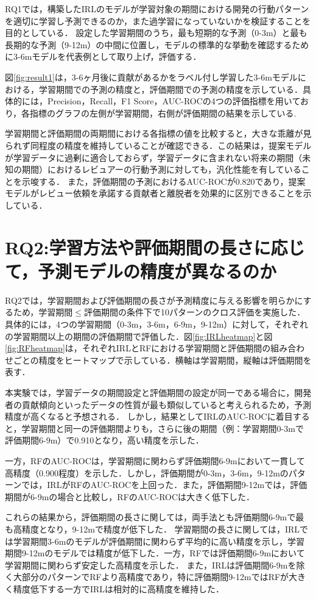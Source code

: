 \documentclass[11pt]{jreport}
\begin{document}
RQ1では，構築したIRLのモデルが学習対象の期間における開発の行動パターンを適切に学習し予測できるのか，また過学習になっていないかを検証することを目的としている．
設定した学習期間のうち，最も短期的な予測（0-3m）と最も長期的な予測（9-12m）の中間に位置し，モデルの標準的な挙動を確認するために3-6mモデルを代表例として取り上げ，評価する．

図\ref{fig:result1}は，3-6ヶ月後に貢献があるかをラベル付し学習した3-6mモデルにおける，学習期間での予測の精度と，評価期間での予測の精度を示している．具体的には，Precision，Recall，F1 Score，AUC-ROCの4つの評価指標を用いており，各指標のグラフの左側が学習期間，右側が評価期間の結果を示している.

学習期間と評価期間の両期間における各指標の値を比較すると，大きな乖離が見られず同程度の精度を維持していることが確認できる．この結果は，提案モデルが学習データに過剰に適合しておらず，学習データに含まれない将来の期間（未知の期間）におけるレビュアーの行動予測に対しても，汎化性能を有していることを示唆する．
また，評価期間の予測におけるAUC-ROCが0.820であり，提案モデルがレビュー依頼を承諾する貢献者と離脱者を効果的に区別できることを示している．

\section{RQ2:学習方法や評価期間の長さに応じて，予測モデルの精度が異なるのか}
RQ2では，学習期間および評価期間の長さが予測精度に与える影響を明らかにするため，学習期間$\leq$評価期間の条件下で10パターンのクロス評価を実施した．具体的には，4つの学習期間（0-3m，3-6m，6-9m，9-12m）に対して，それぞれの学習期間以上の期間の評価期間で評価した．図\ref{fig:IRLheatmap}と図\ref{fig:RFheatmap}は，それぞれIRLとRFにおける学習期間と評価期間の組み合わせごとの精度をヒートマップで示している．横軸は学習期間，縦軸は評価期間を表す．

本実験では，学習データの期間設定と評価期間の設定が同一である場合に，開発者の貢献傾向といったデータの性質が最も類似していると考えられるため，予測精度が高くなると予想される．
しかし，結果としてIRLのAUC-ROCに着目すると，学習期間と同一の評価期間よりも，さらに後の期間（例：学習期間0-3mで評価期間6-9m）で0.910となり，高い精度を示した．


一方，RFのAUC-ROCは，学習期間に関わらず評価期間6-9mにおいて一貫して高精度（0.900程度）を示した．しかし，評価期間が0-3m，3-6m，9-12mのパターンでは，IRLがRFのAUC-ROCを上回った．また，評価期間9-12mでは，評価期間が6-9mの場合と比較し，RFのAUC-ROCは大きく低下した．

これらの結果から，評価期間の長さに関しては，両手法とも評価期間6-9mで最も高精度となり，9-12mで精度が低下した．
学習期間の長さに関しては，IRLでは学習期間3-6mのモデルが評価期間に関わらず平均的に高い精度を示し，学習期間9-12mのモデルでは精度が低下した．一方，RFでは評価期間6-9mにおいて学習期間に関わらず安定した高精度を示した．
また，IRLは評価期間6-9mを除く大部分のパターンでRFより高精度であり，特に評価期間9-12mではRFが大きく精度低下する一方でIRLは相対的に高精度を維持した．
\end{document}
